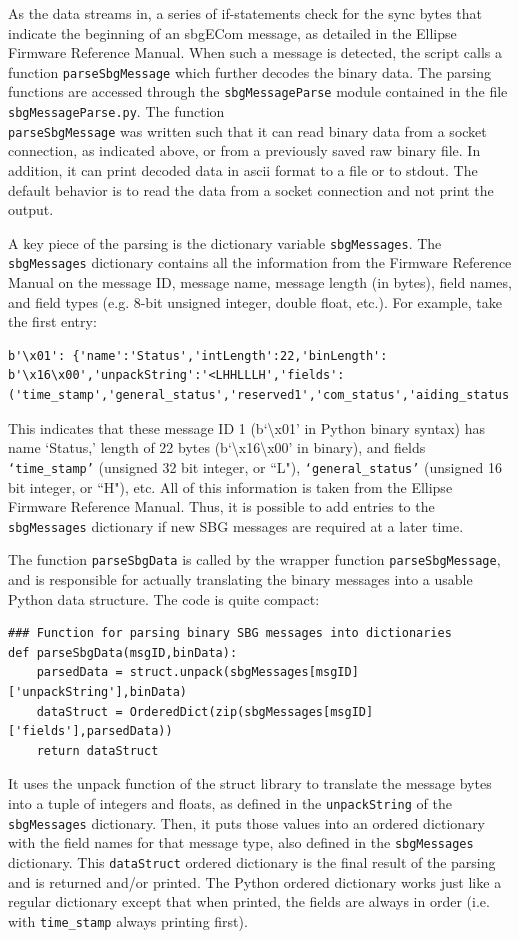 \documentclass[11pt]{amsart}
\begin{document}
As the data streams in, a series of if-statements check for the sync bytes that indicate the beginning of an sbgECom message, as detailed in the Ellipse Firmware Reference Manual.  When such a message is detected, the script calls a function \texttt{parseSbgMessage} which further decodes the binary data.  The parsing functions are accessed through the \texttt{sbgMessageParse} module contained in the file \texttt{sbgMessageParse.py}.  The function \texttt{\\parseSbgMessage} was written such that it can read binary data from a socket connection, as indicated above, or from a previously saved raw binary file.  In addition, it can print decoded data in ascii format to a file or to stdout.  The default behavior is to read the data from a socket connection and not print the output.

 A key piece of the parsing is the dictionary variable \texttt{sbgMessages}.  The \texttt{sbgMessages} dictionary contains all the information from the Firmware Reference Manual on the message ID, message name, message length (in bytes), field names, and field types (e.g. 8-bit unsigned integer, double float, etc.). For example, take the first entry:
 \begin{lstlisting}
b'\x01': {'name':'Status','intLength':22,'binLength': b'\x16\x00','unpackString':'<LHHLLLH','fields':('time_stamp','general_status','reserved1','com_status','aiding_status','reserved2','reserved3')
\end{lstlisting}
 This indicates that these message ID 1 (b`\textbackslash x01' in Python binary syntax) has name `Status,' length of 22 bytes (b`\textbackslash x16\textbackslash x00' in binary), and fields \texttt{`time\_stamp'} (unsigned 32 bit integer, or ``L"), \texttt{`general\_status'} (unsigned 16 bit integer, or ``H"), etc.  All of this information is taken from the Ellipse Firmware Reference Manual.  Thus, it is possible to add entries to the \texttt{sbgMessages} dictionary if new SBG messages are required at a later time. 
  
The function \texttt{parseSbgData} is called by the wrapper function \texttt{parseSbgMessage}, and is responsible for actually translating the binary messages into a usable Python data structure.  The code is quite compact:
 \begin{lstlisting}
### Function for parsing binary SBG messages into dictionaries     
def parseSbgData(msgID,binData):
    parsedData = struct.unpack(sbgMessages[msgID]['unpackString'],binData)
    dataStruct = OrderedDict(zip(sbgMessages[msgID]['fields'],parsedData))
    return dataStruct
\end{lstlisting}
 It uses the unpack function of the struct library to translate the message bytes into a tuple of integers and floats, as defined in the \texttt{unpackString} of the \texttt{sbgMessages} dictionary. Then, it puts those values into an ordered dictionary with the field names for that message type, also defined in the \texttt{sbgMessages} dictionary.  This \texttt{dataStruct} ordered dictionary is the final result of the parsing and is returned and/or printed.  The Python ordered dictionary works just like a regular dictionary except that when printed, the fields are always in order (i.e. with \texttt{time\_stamp} always printing first).
\end{document}
